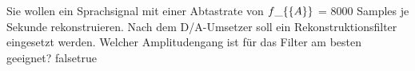     {Sie wollen ein Sprachsignal mit einer Abtastrate von $f\_\{\textrm\{A\}\}$ = 8000 Samples je Sekunde rekonstruieren. Nach dem D/A-Umsetzer soll ein Rekonstruktionsfilter eingesetzt werden. Welcher Amplitudengang ist für das Filter am besten geeignet?}
    {}
    {}
    {}
    {}
    {false}{true}